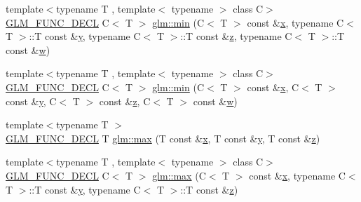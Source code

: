 \begin{DoxyCompactItemize}
\item 
{\footnotesize template$<$typename T , template$<$ typename $>$ class C$>$ }\\\mbox{\hyperlink{setup_8hpp_ab2d052de21a70539923e9bcbf6e83a51}{G\+L\+M\+\_\+\+F\+U\+N\+C\+\_\+\+D\+E\+CL}} C$<$ T $>$ \mbox{\hyperlink{group__gtx__extented__min__max_ga4fe35dd31dd0c45693c9b60b830b8d47}{glm\+::min}} (C$<$ T $>$ const \&\mbox{\hyperlink{glad_8h_a92d0386e5c19fb81ea88c9f99644ab1d}{x}}, typename C$<$ T $>$\+::T const \&\mbox{\hyperlink{glad_8h_a66ddd433d2cacfe27f5906b7e86faeed}{y}}, typename C$<$ T $>$\+::T const \&\mbox{\hyperlink{glad_8h_acb78bf1972d3eaf07da34ff2e0a2f133}{z}}, typename C$<$ T $>$\+::T const \&\mbox{\hyperlink{glad_8h_a1d0296e9e835f2e1ee17634af95fc1ec}{w}})
\item 
{\footnotesize template$<$typename T , template$<$ typename $>$ class C$>$ }\\\mbox{\hyperlink{setup_8hpp_ab2d052de21a70539923e9bcbf6e83a51}{G\+L\+M\+\_\+\+F\+U\+N\+C\+\_\+\+D\+E\+CL}} C$<$ T $>$ \mbox{\hyperlink{group__gtx__extented__min__max_ga7471ea4159eed8dd9ea4ac5d46c2fead}{glm\+::min}} (C$<$ T $>$ const \&\mbox{\hyperlink{glad_8h_a92d0386e5c19fb81ea88c9f99644ab1d}{x}}, C$<$ T $>$ const \&\mbox{\hyperlink{glad_8h_a66ddd433d2cacfe27f5906b7e86faeed}{y}}, C$<$ T $>$ const \&\mbox{\hyperlink{glad_8h_acb78bf1972d3eaf07da34ff2e0a2f133}{z}}, C$<$ T $>$ const \&\mbox{\hyperlink{glad_8h_a1d0296e9e835f2e1ee17634af95fc1ec}{w}})
\item 
{\footnotesize template$<$typename T $>$ }\\\mbox{\hyperlink{setup_8hpp_ab2d052de21a70539923e9bcbf6e83a51}{G\+L\+M\+\_\+\+F\+U\+N\+C\+\_\+\+D\+E\+CL}} T \mbox{\hyperlink{group__gtx__extented__min__max_ga04991ccb9865c4c4e58488cfb209ce69}{glm\+::max}} (T const \&\mbox{\hyperlink{glad_8h_a92d0386e5c19fb81ea88c9f99644ab1d}{x}}, T const \&\mbox{\hyperlink{glad_8h_a66ddd433d2cacfe27f5906b7e86faeed}{y}}, T const \&\mbox{\hyperlink{glad_8h_acb78bf1972d3eaf07da34ff2e0a2f133}{z}})
\item 
{\footnotesize template$<$typename T , template$<$ typename $>$ class C$>$ }\\\mbox{\hyperlink{setup_8hpp_ab2d052de21a70539923e9bcbf6e83a51}{G\+L\+M\+\_\+\+F\+U\+N\+C\+\_\+\+D\+E\+CL}} C$<$ T $>$ \mbox{\hyperlink{group__gtx__extented__min__max_gae1b7bbe5c91de4924835ea3e14530744}{glm\+::max}} (C$<$ T $>$ const \&\mbox{\hyperlink{glad_8h_a92d0386e5c19fb81ea88c9f99644ab1d}{x}}, typename C$<$ T $>$\+::T const \&\mbox{\hyperlink{glad_8h_a66ddd433d2cacfe27f5906b7e86faeed}{y}}, typename C$<$ T $>$\+::T const \&\mbox{\hyperlink{glad_8h_acb78bf1972d3eaf07da34ff2e0a2f133}{z}})

\end{DoxyCompactItemize}
